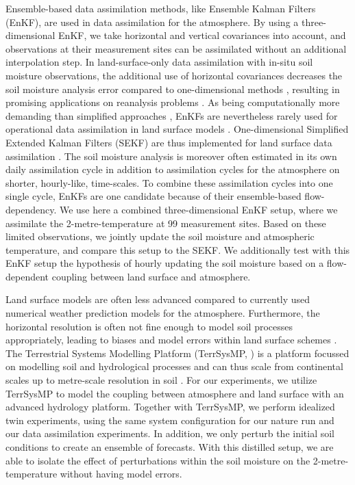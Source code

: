 \documentclass[hess, manuscript]{copernicus}
\begin{document}
Ensemble-based data assimilation methods, like Ensemble Kalman Filters (EnKF), are used in data assimilation for the atmosphere.
By using a three-dimensional EnKF, we take horizontal and vertical covariances into account, and observations at their measurement sites can be assimilated without an additional interpolation step.
In land-surface-only data assimilation with in-situ soil moisture observations, the additional use of horizontal covariances decreases the soil moisture analysis error compared to one-dimensional methods \citep{fairbairn_comparing_2015,reichle_extended_2002}, resulting in promising applications on reanalysis problems \citep{draper_assimilation_2019}.
As being computationally more demanding than simplified approaches \citep{reichle_assessing_2003}, EnKFs are nevertheless rarely used for operational data assimilation in land surface models \citep{carrera_canadian_2015,milbrandt_pan-canadian_2016}.
One-dimensional Simplified Extended Kalman Filters (SEKF) are thus implemented for land surface data assimilation \citep{hess_assimilation_2001,rosnay_simplified_2013, mahfouf_comparison_2009,dharssi_operational_2011,belair_operational_2003,giard_implementation_2000}.
The soil moisture analysis is moreover often estimated in its own daily assimilation cycle in addition to assimilation cycles for the atmosphere on shorter, hourly-like, time-scales.
To combine these assimilation cycles into one single cycle, EnKFs are one candidate because of their ensemble-based flow-dependency. 
We use here a combined three-dimensional EnKF setup, where we assimilate the 2-metre-temperature at 99 measurement sites.
Based on these limited observations, we jointly update the soil moisture and atmospheric temperature, and compare this setup to the SEKF.
We additionally test with this EnKF setup the hypothesis of hourly updating the soil moisture based on a flow-dependent coupling between land surface and atmosphere.

Land surface models are often less advanced compared to currently used numerical weather prediction models for the atmosphere.
Furthermore, the horizontal resolution is often not fine enough to model soil processes appropriately, leading to biases and model errors within land surface schemes \citep{dirmeyer_verification_2017, kauffeldt_imbalanced_2015, orth_advancing_2017, best_plumbing_2015}.
The Terrestrial Systems Modelling Platform (TerrSysMP, \citealt{shrestha_scale-consistent_2014, gasper_implementation_2014}) is a platform focussed on modelling soil and hydrological processes and can thus scale from continental scales \citep{kollet_introduction_2018} up to metre-scale resolution in soil \citep{gebler_high_2017}.
For our experiments, we utilize TerrSysMP to model the coupling between atmosphere and land surface with an advanced hydrology platform.
Together with TerrSysMP, we perform idealized twin experiments, using the same system configuration for our nature run and our data assimilation experiments.
In addition, we only perturb the initial soil conditions to create an ensemble of forecasts.
With this distilled setup, we are able to isolate the effect of perturbations within the soil moisture on the 2-metre-temperature without having model errors.
\end{document}

